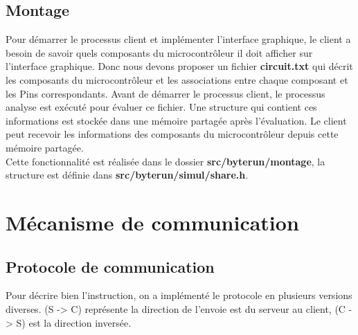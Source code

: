 \documentclass[14px]{article}
\begin{document}
\subsection{Montage}
Pour démarrer le processus client et implémenter l'interface graphique, le client a besoin de savoir quels composants du microcontrôleur il doit afficher sur l'interface graphique. Donc
nous devons proposer un fichier \textbf{circuit.txt} qui décrit les composants du microcontrôleur et les associations entre chaque composant et les Pins correspondants. Avant de démarrer le processus client, le processus analyse est exécuté pour évaluer ce fichier. Une structure qui contient ces informations est stockée dans une mémoire partagée après l'évaluation. Le client peut recevoir les informations des composants du microcontrôleur depuis cette mémoire partagée.\\
Cette fonctionnalité est réalisée dans le dossier \textbf{src/byterun/montage}, la structure est définie dans \textbf{src/byterun/simul/share.h}.


\section{Mécanisme de communication}
\subsection{Protocole de communication}
Pour décrire bien l'instruction, on a implémenté le protocole en plusieurs versions diverses. (S -> C) représente la direction de l'envoie est du serveur au client, (C -> S) est la direction inversée.
\end{document}
